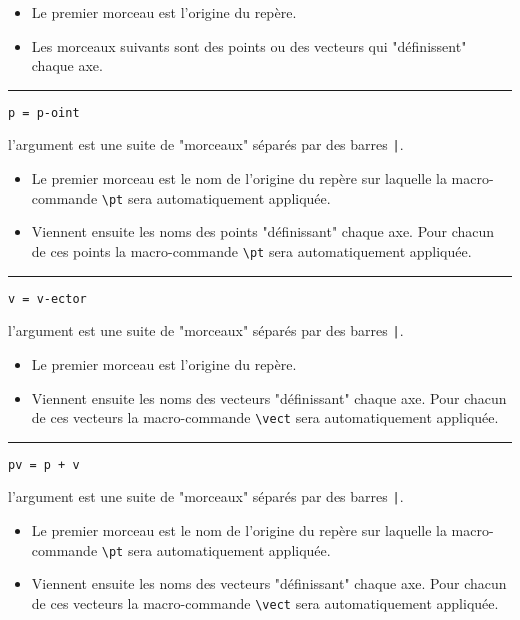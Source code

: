 \documentclass[12pt,a4paper]{article}
\newcommand\env[1]{\texttt{#1}}
\newcommand\macro[1]{\env{\textbackslash{}#1}}
\theoremstyle{definition}
\newcommand\separation{
	\medskip
	\hfill\rule{0.5\textwidth}{0.75pt}\hfill
	\medskip
}
\newcommand\mwhyprefix[2]{%
	\texttt{#1 = #1-#2}%
}
\newcommand\prefix[1]{%
	\texttt{#1}%
}
\begin{document}
\begin{itemize}[topsep=0pt]
	\item Le premier morceau est l'origine du repère.

	\item Les morceaux suivants sont des points ou des vecteurs qui "définissent" chaque axe.
\end{itemize}


\separation

 \hfill \mwhyprefix{p}{oint}

\IDarg{} l'argument est une suite de "morceaux" séparés par des barres \verb+|+.

\begin{itemize}[topsep=0pt]
	\item Le premier morceau est le nom de l'origine du repère sur laquelle la macro-commande \macro{pt} sera automatiquement appliquée.

	\item Viennent ensuite les noms des points "définissant" chaque axe. Pour chacun de ces points la macro-commande \macro{pt} sera automatiquement appliquée.
\end{itemize}


\separation

 \hfill \mwhyprefix{v}{ector}

\IDarg{} l'argument est une suite de "morceaux" séparés par des barres \verb+|+.

\begin{itemize}[topsep=0pt]
	\item Le premier morceau est l'origine du repère.

	\item Viennent ensuite les noms des vecteurs "définissant" chaque axe. Pour chacun de ces vecteurs la macro-commande \macro{vect} sera automatiquement appliquée.
\end{itemize}


\separation

 \hfill \prefix{pv = p + v}

\IDarg{} l'argument est une suite de "morceaux" séparés par des barres \verb+|+.

\begin{itemize}[topsep=0pt]
	\item Le premier morceau est le nom de l'origine du repère sur laquelle la macro-commande \macro{pt} sera automatiquement appliquée.

	\item Viennent ensuite les noms des vecteurs "définissant" chaque axe. Pour chacun de ces vecteurs la macro-commande \macro{vect} sera automatiquement appliquée.
\end{itemize}
\end{document}
